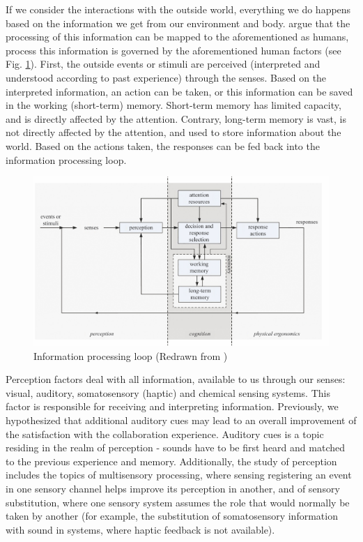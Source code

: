 
If we consider the interactions with the outside world, everything we do happens based on the information we get from our environment and body. \cite{jr_3d_2017} argue that the processing of this information can be mapped to the aforementioned as humans, process this information is governed by the aforementioned human factors (see Fig. \ref{fig:informationprocessingloop}).
First, the outside events or stimuli are perceived (interpreted and understood according to past experience) through the senses. Based on the interpreted information, an action can be taken, or this information can be saved in the working (short-term) memory. Short-term memory has limited capacity, and is directly affected by the attention. Contrary, long-term memory is vast, is not directly affected by the attention, and used to store information about the world. Based on the actions taken, the responses can be fed back into the information processing loop.

\begin{figure}
	\centering
	\includegraphics[width=0.7\linewidth]{figures/placeholders/information_processing_loop}
	\caption{Information processing loop (Redrawn from \cite{jr_3d_2017})}
	\label{fig:informationprocessingloop}
\end{figure}

Perception factors deal with all information, available to us through our senses: visual, auditory, somatosensory (haptic) and chemical sensing systems. This factor is responsible for receiving and interpreting information.
Previously, we hypothesized that additional auditory cues may lead to an overall improvement of the satisfaction with the collaboration experience. Auditory cues is a topic residing in the realm of perception - sounds have to be first heard and matched to the previous experience and memory. 
Additionally, the study of perception includes the topics of multisensory processing, where sensing registering an event in one sensory channel helps improve its perception in another, and of sensory substitution, where one sensory system assumes the role that would normally be taken by another (for example, the substitution of somatosensory information with sound in systems, where haptic feedback is not available).


